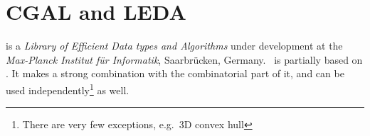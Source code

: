 \section{CGAL and LEDA}

is a {\em Library of Efficient Data types and Algorithms} under development 
at the {\em Max-Planck Institut f\"ur Informatik}, Saarbr\"ucken, Germany.
\cgal\ is partially based on \leda.
It makes a strong combination with the combinatorial part of it, 
and can be used independently\footnote{There are very few exceptions, 
e.g.~3D convex hull} as well.
